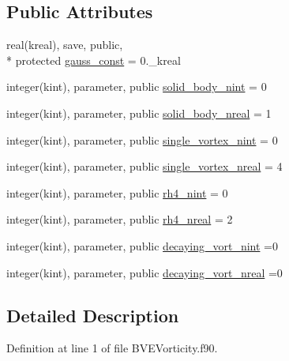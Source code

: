\subsection*{Public Attributes}
\begin{DoxyCompactItemize}
\item 
real(kreal), save, public, \\*
protected \hyperlink{classbvesetupmodule_adc6dbe555dff44ec956fb6679b8a19d8}{gauss\+\_\+const} = 0.\+\_\+kreal
\item 
integer(kint), parameter, public \hyperlink{classbvesetupmodule_a6e22885111c69676713eeea3ed98b527}{solid\+\_\+body\+\_\+nint} = 0
\item 
integer(kint), parameter, public \hyperlink{classbvesetupmodule_acc77359b288c51041c167b38af335774}{solid\+\_\+body\+\_\+nreal} = 1
\item 
integer(kint), parameter, public \hyperlink{classbvesetupmodule_a2c58eb453402e67be55a8905f15297b1}{single\+\_\+vortex\+\_\+nint} = 0
\item 
integer(kint), parameter, public \hyperlink{classbvesetupmodule_a9de664dad47768064654ff03a0fa2a8b}{single\+\_\+vortex\+\_\+nreal} = 4
\item 
integer(kint), parameter, public \hyperlink{classbvesetupmodule_a1e43a3192e12983928ccbf1a38e5e544}{rh4\+\_\+nint} = 0
\item 
integer(kint), parameter, public \hyperlink{classbvesetupmodule_afed13cb11c0291a7baf6d44bd0c74249}{rh4\+\_\+nreal} = 2
\item 
integer(kint), parameter, public \hyperlink{classbvesetupmodule_a0ba83d3f8f11389b0e75ccffc37e61df}{decaying\+\_\+vort\+\_\+nint} =0
\item 
integer(kint), parameter, public \hyperlink{classbvesetupmodule_a515b33c3a7c090f07e283e4c8bbd734d}{decaying\+\_\+vort\+\_\+nreal} =0
\end{DoxyCompactItemize}


\subsection{Detailed Description}


Definition at line 1 of file B\+V\+E\+Vorticity.\+f90.



